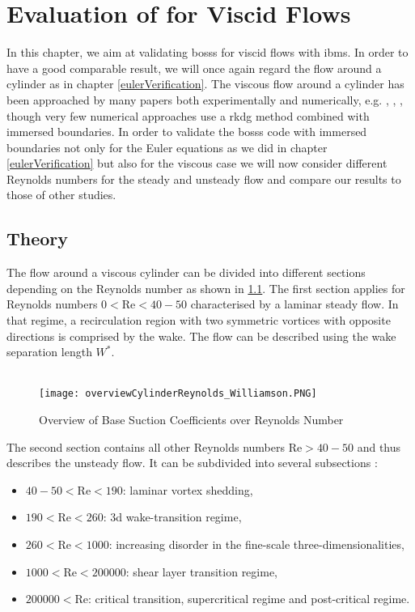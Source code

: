 \chapter{Evaluation of  for Viscid Flows}
\label{viscousCylinder}
In this chapter, we aim at validating \gls{bosss} for viscid flows with \gls{ibm}s. In order to have a good comparable result, we will once again regard the flow around a cylinder as in chapter \cref{eulerVerification}. 
The viscous flow around a cylinder has been approached by many papers both experimentally and numerically, e.g. \textcite{williamson1996vortex}, \textcite{FLM:14223}, \textcite{canutoTaira}, though very few numerical approaches use a \gls{rkdg} method combined with immersed boundaries. In order to validate the \gls{bosss} code with immersed boundaries not only for the Euler equations as we did in chapter \cref{eulerVerification} but also for the viscous case we will now consider different Reynolds numbers for the steady and unsteady flow and compare our results to those of other studies.

\section{Theory}
	The flow around a viscous cylinder can be divided into different sections depending on the Reynolds number as shown in \cref{fig:overview}. The first section applies for Reynolds numbers $0 < \text{Re} < 40-50$ characterised by a laminar steady flow. In that regime, a recirculation region with two symmetric vortices with opposite directions is comprised by the wake. The flow can be described using the wake separation length $W^*$.\\\\
	\begin{figure}[htp]
		\centering
		\texttt{[image: overviewCylinderReynolds\_Williamson.PNG]}
		\caption{Overview of Base Suction Coefficients over Reynolds Number \cite{williamson1996vortex}}
		\label{fig:overview}
	\end{figure} 
	The second section contains all other Reynolds numbers $\text{Re}> 40-50$ and thus describes the unsteady flow. It can be subdivided into several subsections \cite{williamson1996vortex}:
	\begin{itemize}
		\item $40-50 < \text{Re} < 190$: laminar vortex shedding,
		\item $190 < \text{Re} < 260$: \gls{3d} wake-transition regime,
		\item $260 < \text{Re} < 1000$: increasing disorder in the fine-scale three-dimensionalities,
		\item $1000 < \text{Re} < 200000$: shear layer transition regime,
		\item $200000 < \text{Re}$: critical transition, supercritical regime and post-critical regime.
	\end{itemize}
	
